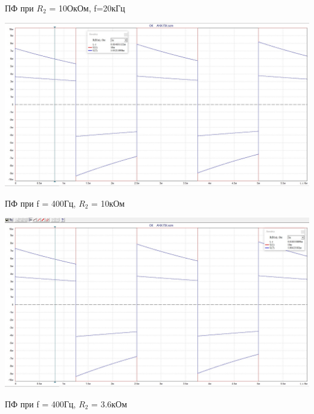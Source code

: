 \documentclass[a4paper,14pt]{extarticle}
\begin{document}
    ПФ при $R_2$ = 10ОкОм, f=20кГц

    \begin{center}
        \includegraphics[scale=0.3]{5.3.jpg}
    \end{center}
    
    ПФ при f = 400Гц, $R_2$ = 10кОм 

    \begin{center}
        \includegraphics[scale=0.3]{5.4.jpg}
    \end{center}

    ПФ при f = 400Гц, $R_2$ = 3.6кОм 
\end{document}
